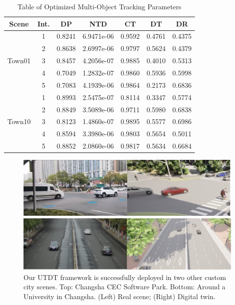 \documentclass[journal,twoside,web]{ieeecolor}
\begin{document}
\begin{table}[t]
	\centering
	\caption{Table of Optimized Multi-Object Tracking Parameters}
	\label{tab:4}
	\renewcommand\arraystretch{1.3}
	\begin{tabular}{|c|c|c|c|c|c|c|}
		
		\hline
		Scene & Int. & DP & NTD & CT & DT & DR \\
		\hline
		\multirow{5}{*}{Town01} & 1 & 0.8241 & 6.9471e-06 & 0.9592 & 0.4761 & 0.4375 \\
		\cline{2-7}
		& 2 & 0.8638 & 2.6997e-06 & 0.9797 & 0.5624 & 0.4379 \\
		\cline{2-7}
		& 3 & 0.8457 & 4.2056e-07 & 0.9885 & 0.4010 & 0.5313 \\
		\cline{2-7}
		& 4 & 0.7049 & 1.2832e-07 & 0.9860 & 0.5936 & 0.5998 \\
		\cline{2-7}
		& 5 & 0.7083 & 4.1939e-06 & 0.9864 & 0.2173 & 0.6836 \\
		\hline
		\multirow{5}{*}{Town10} & 1 & 0.8993 & 2.5475e-07 & 0.8114 & 0.3347 & 0.5774 \\
		\cline{2-7}
		& 2 & 0.8849 & 3.5089e-06 & 0.9711 & 0.5980 & 0.6838 \\
		\cline{2-7}
		& 3 & 0.8123 & 1.4860e-07 & 0.9895 & 0.5577 & 0.6986 \\
		\cline{2-7}
		& 4 & 0.8594 & 3.3980e-06 & 0.9803 & 0.5654 & 0.5011 \\
		\cline{2-7}
		& 5 & 0.8852 & 2.0860e-06 & 0.9817 & 0.5634 & 0.6684 \\
		\hline
	\end{tabular}
\end{table}

\begin{figure}[!t]
	\centerline{\includegraphics[width=\columnwidth]{picture/picture8.eps}}
	\caption{Our UTDT framework is successfully deployed in two other custom city scenes. Top: Changsha CEC Software Park. Bottom: Around a University in Changsha. (Left) Real scene; (Right) Digital twin.} 
	\label{fig:8} 
\end{figure}
\end{document}
